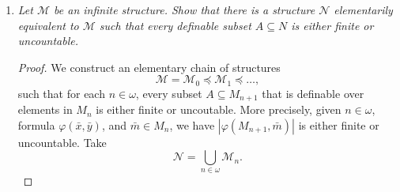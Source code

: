 \documentclass{article}
\begin{document}
\begin{enumerate}[label={\bf Q\arabic*:}]
\begin{proof}
      In the second case, every element $a\in M$ has a witness $a'\in M$
      for $P(a,a')$ such that $a'=t(a)$ for some $\mathcal{L}$-term $t(x)$.
      We construct an elementary extension $\mathcal{N}\succ\mathcal{M}$
      such that $\mathcal{N}$ falls under case 1 above. Add to language
      $\mathcal{L}(\mathcal{M})$ a new constant symbol $c$, i.e.
      $\mathcal{L}':=\mathcal{L}(\mathcal{M})\cup\{c\}$. In this extended
      language, consider the theory
      \[T':=T_\mathcal{M}\cup \{\neg P(c,t(c)):t^\mathcal{M}(x)\;
        \text{is an}\; \mathcal{L}\text{-term}\}.\]

      Then $T'$ is finitely satisfiable by $\mathcal{M}$: Clearly
      $\mathcal{M}$ satisfies $T_\mathcal{M}$. Given any finite set of
      $\mathcal{L}$-terms $t_1(x),\ldots,t_m(x)$ in variable $x$, because
      $\mathcal{M}$ satisfies equation~\eqref{eqn:neg}, there must be an
      element $a\in M$ that satisfies $\neg P(a,t_i(a))$ for all
      $i\in\{1,\ldots,m\}$. Assigning $c$ to this element $a$, we will have
      $\mathcal{M}\models T'$. Thus by Compactness theorem, $T'$
      has a model $\mathcal{N}$, which will also be a model of $T$ since
      $\mathcal{N}\models T_\mathcal{M}\supset T$. However in
      $\mathcal{N}$, the constant element $c$ does not have a witness $c'$
      of $P(c,c')$ which is a term $t(c)$ of $c$. Thus $\mathcal{N}$ is the
      same as case 1 above, where we defined a substructure that
      gives a contradiction.
    \end{proof}

  \item \it Let $\mathcal{M}$ be an infinite structure. Show that there is
    a structure $\mathcal{N}$ elementarily equivalent to $\mathcal{M}$ such
    that every definable subset $A\subseteq N$ is either finite or
    uncountable.

    \begin{proof}
      We construct an elementary chain of structures
      \[\mathcal{M}=\mathcal{M}_0\preceq \mathcal{M}_1\preceq\ldots,\]
      such that for each $n\in\omega$, every subset $A\subseteq M_{n+1}$
      that is definable over elements in $M_n$ is either finite or
      uncoutable. More precisely, given $n\in\omega$, formula
      $\varphi(\bar{x},\bar{y})$, and $\bar{m}\in M_n$, we have
      $|\varphi(M_{n+1},\bar{m})|$ is either finite or uncountable. Take
      \[\mathcal{N}=\bigcup_{n\in\omega}\mathcal{M}_n.\]


\end{proof}
\end{enumerate}
\end{document}
